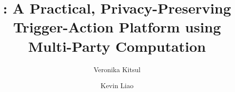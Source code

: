 \documentclass[sigplan,10pt]{acmart}
\begin{document}
\sloppy

\title{\sys: A Practical, Privacy-Preserving Trigger-Action Platform using Multi-Party Computation}

\author{Veronika Kitsul}

\author{Kevin Liao}



\maketitle






















\end{document}
